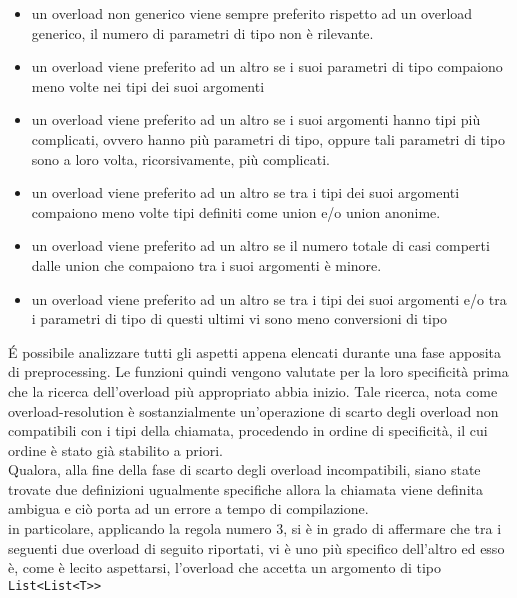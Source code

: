 \begin{itemize}
    \item{
        un overload non generico viene sempre preferito rispetto ad un overload generico, il 
        numero di parametri di tipo non è rilevante.
    }
    \item{
        un overload viene preferito ad un altro se i suoi parametri di tipo compaiono 
        meno volte nei tipi dei suoi argomenti
    }
    \item{
        un overload viene preferito ad un altro se i suoi argomenti hanno tipi più complicati, 
        ovvero hanno più parametri di tipo, oppure tali parametri di tipo sono a loro volta, 
        ricorsivamente, più complicati. 
    }
    \item{
        un overload viene preferito ad un altro se tra i tipi dei suoi argomenti 
        compaiono meno volte tipi definiti come union e/o union anonime.
    }
    \item{
        un overload viene preferito ad un altro se il numero totale di casi comperti dalle 
        union che compaiono tra i suoi argomenti è minore.
    }
    \item{
        un overload viene preferito ad un altro se tra i tipi dei suoi argomenti e/o tra i 
        parametri di tipo di questi ultimi vi sono meno conversioni di tipo
    }
\end{itemize}

É possibile analizzare tutti gli aspetti appena elencati durante una fase apposita 
di preprocessing. Le funzioni quindi vengono valutate per la loro specificità 
prima che la ricerca dell’overload più appropriato abbia inizio. Tale ricerca, 
nota come overload-resolution è sostanzialmente un’operazione di scarto degli 
overload non compatibili con i tipi della chiamata, procedendo in ordine di specificità, 
il cui ordine è stato già stabilito a priori. \\

Qualora, alla fine della fase di scarto 
degli overload incompatibili, siano state trovate due definizioni ugualmente specifiche 
allora la chiamata viene definita ambigua e ciò porta ad un errore a tempo di compilazione. \\

in particolare, applicando la regola numero 3, si è in grado di affermare 
che tra i seguenti due overload di seguito riportati, vi è uno più specifico 
dell’altro ed esso è, come è lecito aspettarsi, l’overload che 
accetta un argomento di tipo \texttt{List<List<T>\>>}

